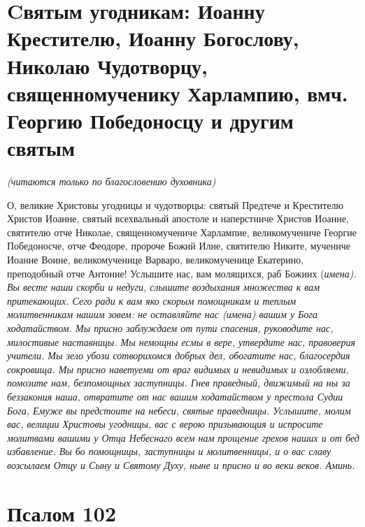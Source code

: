 \section{Cвятым угодникам: Иоанну Крестителю, Иоанну Богослову, Николаю Чудотворцу, священномученику Харлампию, вмч. Георгию Победоносцу и другим святым}
 


\itshape (читаются только по благословению духовника)\normalfont{}




О, великие Христовы угодницы и чудотворцы: святый Предтече и Крестителю Христов Иоанне, святый всехвальный апостоле и наперстниче Христов Иоанне, святителю отче Николае, священномучениче Харлампие, великомучениче Георгие Победоносче, отче Феодоре, пророче Божий Илие, святителю Никите, мучениче Иоанне Воине, великомученице Варваро, великомученице Екатерино, преподобный отче Антоние! Услышите нас, вам молящихся, раб Божиих (\itshape имена\normalfont{}). Вы весте наши скорби и недуги, слышите воздыхания множества к вам притекающих. Сего ради к вам яко скорым помощникам и теплым молитвенникам нашим зовем: не оставляйте нас (\itshape имена\normalfont{}) вашим у Бога ходатайством. Мы присно заблуждаем от пути спасения, руководите нас, милостивые наставницы. Мы немощны есмы в вере, утвердите нас, правоверия учители. Мы зело убози сотворихомся добрых дел, обогатите нас, благосердия сокровища. Мы присно наветуеми от враг видимых и невидимых и озлобляеми, помозите нам, безпомощных заступницы. Гнев праведный, движимый на ны за беззакония наша, отвратите от нас вашим ходатайством у престола Судии Бога, Емуже вы предстоите на небеси, святые праведницы. Услышите, молим вас, велиции Христовы угодницы, вас с верою призывающия и испросите молитвами вашими у Отца Небеснаго всем нам прощение грехов наших и от бед избавление. Вы бо помощницы, заступницы и молитвенницы, и о вас славу возсылаем Отцу и Сыну и Святому Духу, ныне и присно и во веки веков. Аминь.


\section{Псалом 102}
 


